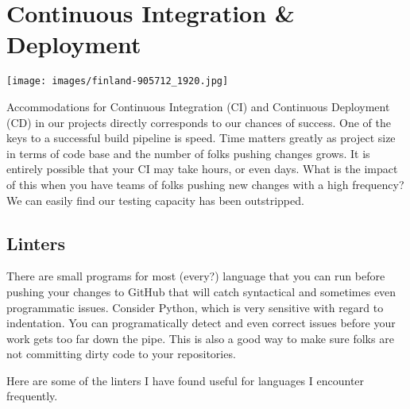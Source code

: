 \chapter{Continuous Integration \& Deployment}

\texttt{[image: images/finland-905712\_1920.jpg]}

\justify{}
Accommodations for Continuous Integration (CI) and Continuous Deployment
(CD) in our projects directly corresponds to our chances of success. One of the keys to 
a successful build pipeline is speed. Time matters greatly as project size in terms of
code base and the number of folks pushing changes grows. It is entirely possible that
your CI may take hours, or even days. What is the impact of this when you have teams
of folks pushing new changes with a high frequency? We can easily find our testing
capacity has been outstripped. 

\section{Linters}

\justify{}
There are small programs for most (every?) language that you can run before
pushing your changes to GitHub that will catch syntactical and sometimes
even programmatic issues. Consider Python, which is very sensitive with
regard to indentation. You can programatically detect and even correct issues
before your work gets too far down the pipe. This is also a good way to
make sure folks are not committing dirty code to your repositories.

\justify{}
Here are some of the linters I have found useful for languages I encounter
frequently.


